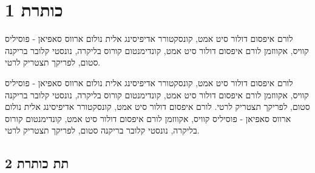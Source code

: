 \documentclass[a4paper,]{article}
\author{}
\date{}
\begin{document}
\NewCoffin\Output   %
\NewCoffin\Callout %
\NewCoffin\BackFrame %
\NewCoffin\SideRule  %


\newcommand{\SetCallout}[2]{%
  \SetHorizontalCoffin\Output{} %
  \SetVerticalCoffin\Callout{\linewidth-20pt}{\textbf{#1} \\ #2 \leavevmode \\ \\}

  \SetHorizontalCoffin\BackFrame{
    \begingroup
    \color{green!30!gray!15}\rule{\linewidth}{\CoffinTotalHeight\Callout}
    \endgroup
  }
  \SetHorizontalCoffin\SideRule{
    \begingroup
    \color{green!50!black}\rule{3pt}{\CoffinTotalHeight\Callout}
    \endgroup
  } %

  \JoinCoffins*\Output[l,t]\Callout[l,t](10pt,-\baselineskip) %
  \JoinCoffins*\Output[l,t]\SideRule[l,t] %
  \JoinCoffins*\Output[l,t]\BackFrame[l,t] %
  \noindent\TypesetCoffin\Output %
  \vspace*{\CoffinTotalHeight\Callout}\bigskip %
}

\section{כותרת 1}\label{ux5dbux5d5ux5eaux5e8ux5ea-1}

לורם איפסום דולור סיט אמט, קונסקטורר אדיפיסינג אלית נולום ארווס סאפיאן -
פוסיליס קוויס, אקווזמן לורם איפסום דולור סיט אמט, קונדימנטום קורוס
בליקרה, נונסטי קלובר בריקנה סטום, לפריקך תצטריק לרטי.

לורם איפסום דולור סיט אמט, קונסקטורר אדיפיסינג אלית נולום ארווס סאפיאן -
פוסיליס קוויס, אקווזמן לורם איפסום דולור סיט אמט, קונדימנטום קורוס
בליקרה, נונסטי קלובר בריקנה סטום, לפריקך תצטריק לרטי. לורם איפסום דולור
סיט אמט, קונסקטורר אדיפיסינג אלית נולום ארווס סאפיאן - פוסיליס קוויס,
אקווזמן לורם איפסום דולור סיט אמט, קונדימנטום קורוס בליקרה, נונסטי קלובר
בריקנה סטום, לפריקך תצטריק לרטי.

\subsection{תת כותרת 2}\label{ux5eaux5ea-ux5dbux5d5ux5eaux5e8ux5ea-2}
\end{document}
